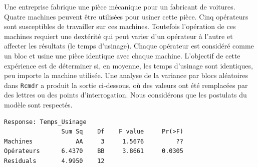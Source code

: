 \begin{questions}
\question 
Une entreprise fabrique une pièce mécanique pour un fabricant de voitures. Quatre machines peuvent être utilisées pour usiner cette pièce. Cinq opérateurs sont susceptibles de travailler sur ces machines. Toutefois l'opération de ces machines requiert une  dextérité qui peut varier d'un opérateur à l'autre et affecter les résultats (le temps d'usinage). %
Chaque opérateur est considéré comme un bloc et usine une pièce identique avec chaque machine.
L'objectif de cette expérience est de déterminer si, en moyenne, les temps d'usinage sont identiques, peu importe la machine utilisée. Une analyse de la variance par blocs aléatoires dans \texttt{Rcmdr} a produit la sortie ci-dessous, où des valeurs ont été remplacées par des lettres ou des points d'interrogation. Nous considérons que les postulats 
 du modèle sont respectés.

\begin{verbatim}
Response: Temps_Usinage
                Sum Sq    Df    F value     Pr(>F)
Machines            AA     3     1.5676         ??
Opérateurs      6.4370    BB     3.8661     0.0305 
Residuals       4.9950    12
\end{verbatim}

\medskip

\end{questions}
